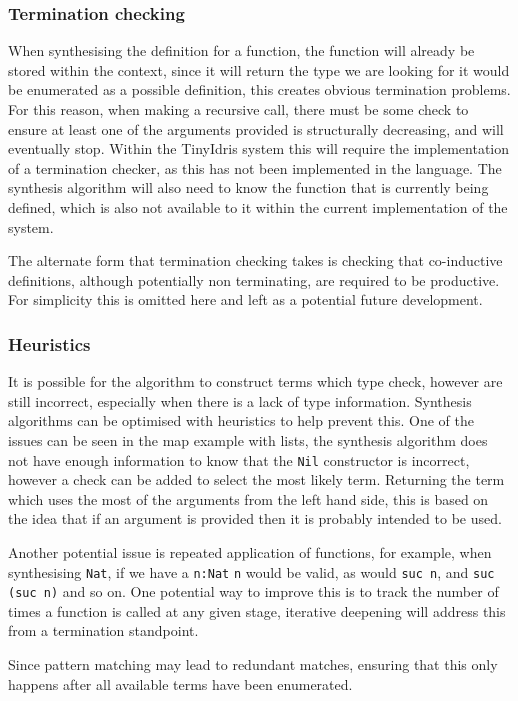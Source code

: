 \documentclass[a4paper]{article}
\begin{document}
\subsubsection{Termination checking}
\label{sec:orgf073f6b}
When synthesising the definition for a function, the function will already be stored within the context, since it will 
return the type we are looking for it would be enumerated as a possible definition, this creates obvious termination 
problems. For this reason, when making a recursive call, there must be some check to ensure at least one of the 
arguments provided is structurally decreasing, and will eventually stop. Within the TinyIdris system this will require the 
implementation of a termination checker, as this has not been implemented in the language. The synthesis algorithm will also need to know 
the function that is currently being defined, which is also not available to it within the current implementation of the 
system. 

The alternate form that termination checking takes is checking that co-inductive definitions, although potentially non 
terminating, are required to be productive. For simplicity this is omitted here and left as a potential future development.
\subsubsection{Heuristics}
\label{sec:org632d28f}
It is possible for the algorithm to construct terms which type check, however are still incorrect, especially 
when there is a lack of type information. Synthesis algorithms can be optimised with heuristics to help prevent this.
One of the issues can be seen in the map example with lists, the synthesis algorithm does not have enough information to 
know that the \texttt{Nil} constructor is incorrect, however a check can be added to select the most likely term.
Returning the term which uses the most of the arguments from the left hand side, this is based on the idea that 
if an argument is provided then it is probably intended to be used. 

Another potential issue is repeated application of functions, for example, when synthesising \texttt{Nat}, if we have a \texttt{n:Nat}
\texttt{n} would be valid, as would \texttt{suc n}, and \texttt{suc (suc n)} and so on. One potential way to improve this is to track the number 
of times a function is called at any given stage, iterative deepening will address this from a termination standpoint.

Since pattern matching may lead to redundant matches, ensuring that this only happens after all available terms 
have been enumerated. 
\end{document}
